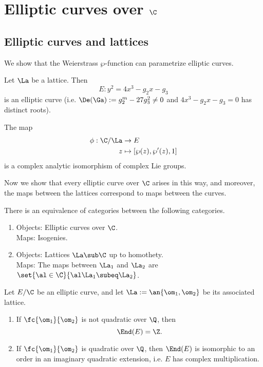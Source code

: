 \chapter{Elliptic curves over $\C$}
\section{Elliptic curves and lattices}
We show that the Weierstrass $\wp$-function can parametrize elliptic curves.
\begin{thm}
Let $\La$ be a lattice. Then 
\[E:y^2=4x^3-g_2x-g_3\] is an elliptic curve (i.e. $\De(\Ga):=g_2^m-27g_3^2\ne 0$ and $4x^3-g_2x-g_3=0$ has distinct roots).

The map
\begin{align*}
\phi:\C/\La&\to E\\
z&\mapsto [\wp(z),\wp'(z),1]
\end{align*}
is a complex analytic isomorphism of complex Lie groups.
\end{thm}

Now we show that every elliptic curve over $\C$ arises in this way, and moreover, the maps between the lattices correspond to maps between the curves.
\begin{thm}
There is an equivalence of categories between the following categories.
\begin{enumerate}
\item
Objects: Elliptic curves over $\C$.\\
Maps: Isogenies.
\item
Objects: Lattices $\La\sub \C$ up to homothety.\\
Maps: The maps between $\La_1$ and $\La_2$ are $\set{\al\in \C}{\al\La_1\subeq \La_2}$.
\end{enumerate}
\end{thm}
\begin{thm}
Let $E/\C$ be an elliptic curve, and let $\La:=\an{\om_1,\om_2}$ be its associated lattice.
\begin{enumerate}
\item
If $\fc{\om_1}{\om_2}$ is not quadratic over $\Q$, then
\[
\End(E)=\Z.
\]
\item 
If $\fc{\om_1}{\om_2}$ is quadratic over $\Q$, then
$\End(E)$ is isomorphic to an order in an imaginary quadratic extension, i.e. $E$ has complex multiplication.
\end{enumerate}
\end{thm}
